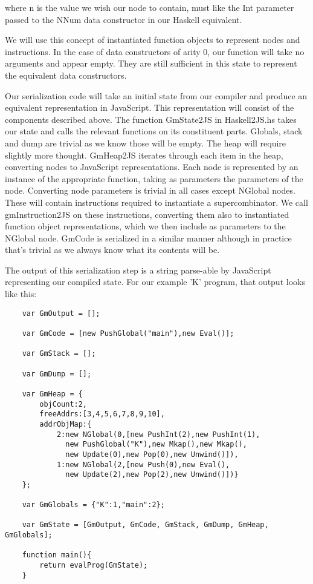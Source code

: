 \begin{enumerate}
          where n is the value we wish our node to contain, 
          must like the Int parameter passed to the NNum data
          constructor in our Haskell equivalent. 

          We will use this concept of instantiated function
          objects to represent nodes and instructions. In the
          case of data constructors of arity 0, our function
          will take no arguments and appear empty. They are
          still sufficient in this state to represent the
          equivalent data constructors.
\end{enumerate}

Our serialization code will take an initial state from our
compiler and produce an equivalent representation in JavaScript.
This representation will consist of the components described
above. The function GmState2JS in Haskell2JS.hs takes our 
state and calls the relevant functions on its constituent 
parts. Globals, stack and dump are trivial as we know those
will be empty. The heap will require slightly more thought.
GmHeap2JS iterates through each item in the heap, converting
nodes to JavaScript representations. Each node is represented
by an instance of the appropriate function, taking as parameters
the parameters of the node. Converting node parameters is 
trivial in all cases except NGlobal nodes. These will contain
instructions required to instantiate a supercombinator. We
call gmInstruction2JS on these instructions, converting them
also to instantiated function object representations, which
we then include as parameters to the NGlobal node. GmCode
is serialized in a similar manner although in practice that's
trivial as we always know what its contents will be.

The output of this serialization step is a string parse-able
by JavaScript representing our compiled state. For our example
'K' program, that output looks like this:

\begin{verbatim}
    var GmOutput = [];
     
    var GmCode = [new PushGlobal("main"),new Eval()];
     
    var GmStack = [];
     
    var GmDump = [];
     
    var GmHeap = {
        objCount:2,
        freeAddrs:[3,4,5,6,7,8,9,10],
        addrObjMap:{
            2:new NGlobal(0,[new PushInt(2),new PushInt(1),
              new PushGlobal("K"),new Mkap(),new Mkap(),
              new Update(0),new Pop(0),new Unwind()]),
            1:new NGlobal(2,[new Push(0),new Eval(),
              new Update(2),new Pop(2),new Unwind()])}
    };
 
    var GmGlobals = {"K":1,"main":2};
     
    var GmState = [GmOutput, GmCode, GmStack, GmDump, GmHeap, GmGlobals]; 
     
    function main(){
        return evalProg(GmState);
    }
\end{verbatim}

